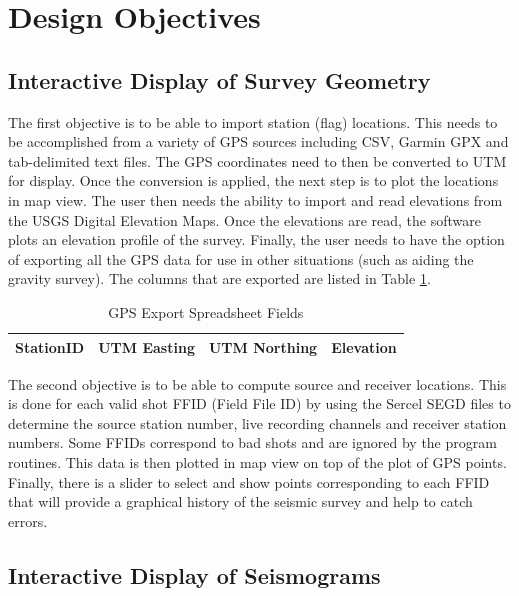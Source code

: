 \documentclass[12pt]{article}
\begin{document}
\section{Design Objectives}
\subsection{Interactive Display of Survey Geometry}

The first objective is to be able to import station (flag) locations. This needs to be accomplished from a variety of GPS sources including CSV, Garmin GPX and tab-delimited text files. The GPS coordinates need to then be converted to UTM for display. Once the conversion is applied, the next step is to plot the locations in map view. The user then needs the ability to import and read elevations from the USGS Digital Elevation Maps. Once the elevations are read, the software plots an elevation profile of the survey. Finally, the user needs to have the option of exporting all the GPS data for use in other situations (such as aiding the gravity survey). The columns that are exported are listed in Table \ref{TAB:GPS}.

\begin{table}[h]
\caption{GPS Export Spreadsheet Fields}
\centering
\begin{tabular}{ c | c | c | c}
  \hline                  
  StationID & UTM Easting & UTM Northing & Elevation \\
  \hline
\end{tabular}
\label{TAB:GPS}
\end{table}

The second objective is to be able to compute source and receiver locations. This is done for each valid shot FFID (Field File ID) by using the Sercel SEGD files to determine the source station number, live recording channels and receiver station numbers. Some FFIDs correspond to bad shots and are ignored by the program routines. This data is then plotted in map view on top of the plot of GPS points. \\

Finally, there is a slider to select and show points corresponding to each FFID that will provide a graphical history of the seismic survey and help to catch errors. 

\subsection{Interactive Display of Seismograms} 
\end{document}
